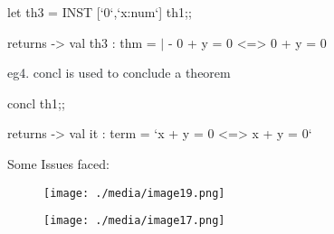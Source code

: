 \documentclass[12pt]{article}
\renewcommand{\_}{\kern-1.5pt\textunderscore\kern-1.5pt}
\begin{document}
let th3 = INST [`0`,`x:num`] th1;;\par

returns -> val th3 : thm = $ \vert $ - 0 + y = 0 <=> 0 + y = 0\par


\vspace{\baselineskip}
\textcolor[HTML]{1B1F22}{eg4. concl is used to conclude a theorem}\par

concl th1;;\par

returns -> val it : term = `x + y = 0 <=> x + y = 0`\par


\vspace{\baselineskip}

\vspace{\baselineskip}

\vspace{\baselineskip}
\begin{FlushLeft}
{\fontsize{14pt}{16.8pt}\selectfont Some Issues faced:\par}
\end{FlushLeft}\par


\vspace{\baselineskip}



\begin{figure}[H]
	\begin{FlushLeft}		\texttt{[image: ./media/image19.png]}
	\end{FlushLeft}\end{figure}



\par




\begin{figure}[H]
	\begin{FlushLeft}		\texttt{[image: ./media/image17.png]}
	\end{FlushLeft}\end{figure}


\end{document}
